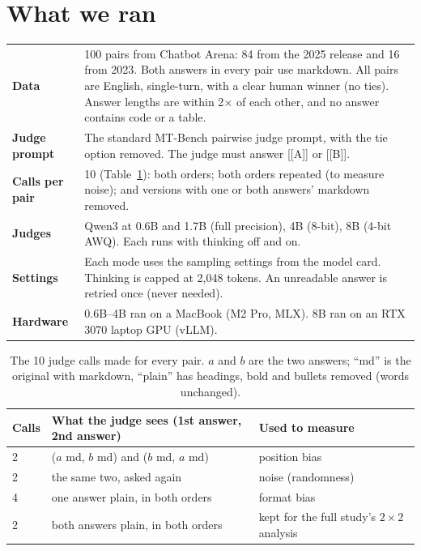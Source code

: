 \documentclass[10.5pt]{article}
\begin{document}
\section{What we ran}
\begin{table}[H]
\centering\small
\begin{tabularx}{\linewidth}{>{\bfseries}p{3.0cm} X}
\toprule
Data & 100 pairs from Chatbot Arena: 84 from the 2025 release and 16 from 2023. Both answers in every pair use
markdown. All pairs are English, single-turn, with a clear human winner (no ties). Answer lengths are within 2$\times$
of each other, and no answer contains code or a table. \\
Judge prompt & The standard MT-Bench pairwise judge prompt, with the tie option removed. The judge must answer
[[A]] or [[B]]. \\
Calls per pair & 10 (Table~\ref{tab:design}): both orders; both orders repeated (to measure noise); and versions
with one or both answers' markdown removed. \\
Judges & Qwen3 at 0.6B and 1.7B (full precision), 4B (8-bit), 8B (4-bit AWQ). Each runs with thinking off and on. \\
Settings & Each mode uses the sampling settings from the model card. Thinking is capped at 2{,}048 tokens.
An unreadable answer is retried once (never needed). \\
Hardware & 0.6B--4B ran on a MacBook (M2 Pro, MLX). 8B ran on an RTX 3070 laptop GPU (vLLM). \\
\bottomrule
\end{tabularx}
\end{table}

\begin{table}[H]
\centering\small
\caption{The 10 judge calls made for every pair. $a$ and $b$ are the two answers; ``md'' is the original with
markdown, ``plain'' has headings, bold and bullets removed (words unchanged).}
\label{tab:design}
\begin{tabular}{lll}
\toprule
Calls & What the judge sees (1st answer, 2nd answer) & Used to measure \\
\midrule
2 & ($a$ md, $b$ md) and ($b$ md, $a$ md) & position bias \\
2 & the same two, asked again & noise (randomness) \\
4 & one answer plain, in both orders & format bias \\
2 & both answers plain, in both orders & kept for the full study's $2\times2$ analysis \\
\bottomrule
\end{tabular}
\end{table}
\end{document}
